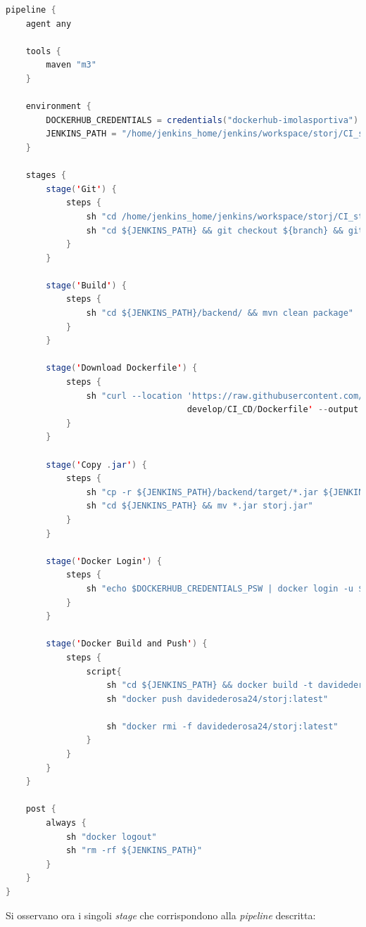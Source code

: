 \documentclass{article}
\begin{document}
\begin{lstlisting}[language = JAVA]
pipeline {
    agent any
    
    tools {
        maven "m3"
    }
    
    environment {
        DOCKERHUB_CREDENTIALS = credentials("dockerhub-imolasportiva")
        JENKINS_PATH = "/home/jenkins_home/jenkins/workspace/storj/CI_storj/storj_SWE"
    }
    
    stages {
        stage('Git') {
            steps {
                sh "cd /home/jenkins_home/jenkins/workspace/storj/CI_storj/ && git clone https://github.com/DavideDeRosa/storj_SWE"
                sh "cd ${JENKINS_PATH} && git checkout ${branch} && git pull"
            }
        }
        
        stage('Build') {
            steps {
                sh "cd ${JENKINS_PATH}/backend/ && mvn clean package"
            }
        }
        
        stage('Download Dockerfile') {
            steps {
                sh "curl --location 'https://raw.githubusercontent.com/DavideDeRosa/storJ_SWE/
                                    develop/CI_CD/Dockerfile' --output ${JENKINS_PATH}/Dockerfile"
            }
        }
        
        stage('Copy .jar') {
            steps {
                sh "cp -r ${JENKINS_PATH}/backend/target/*.jar ${JENKINS_PATH}"
                sh "cd ${JENKINS_PATH} && mv *.jar storj.jar"
            }
        }
        
        stage('Docker Login') {
            steps {
                sh "echo $DOCKERHUB_CREDENTIALS_PSW | docker login -u $DOCKERHUB_CREDENTIALS_USR --password-stdin"
            }
        }
        
        stage('Docker Build and Push') {
            steps {
                script{
                    sh "cd ${JENKINS_PATH} && docker build -t davidederosa24/storj:latest ."
                    sh "docker push davidederosa24/storj:latest"
                    
                    sh "docker rmi -f davidederosa24/storj:latest"
                }
            }
        }
    }
    
    post {
        always {
            sh "docker logout"
            sh "rm -rf ${JENKINS_PATH}"
        }
    }
}
\end{lstlisting}
Si osservano ora i singoli \textit{stage} che corrispondono alla \textit{pipeline} descritta:
\end{document}
